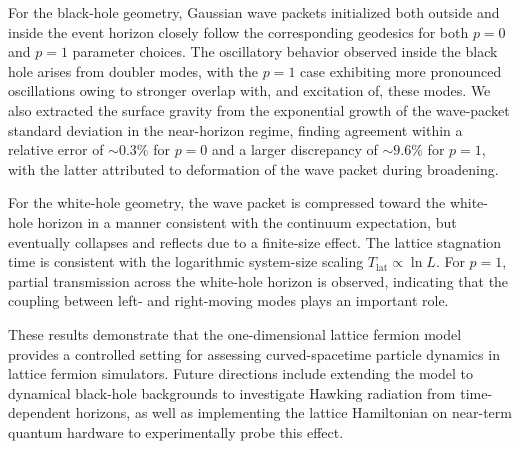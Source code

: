 \documentclass[reprint,amsmath,amssymb,aps,prb,showkeys]{revtex4-2}
\begin{document}
For the black-hole geometry, Gaussian wave packets initialized both outside and inside the event horizon closely follow the corresponding geodesics for both $p=0$ and $p=1$ parameter choices. The oscillatory behavior observed inside the black hole arises from doubler modes, with the $p=1$ case exhibiting more pronounced oscillations owing to stronger overlap with, and excitation of, these modes. We also extracted the surface gravity from the exponential growth of the wave-packet standard deviation in the near-horizon regime, finding agreement within a relative error of $\sim 0.3\%$ for $p=0$ and a larger discrepancy of $\sim 9.6\%$ for $p=1$, with the latter attributed to deformation of the wave packet during broadening.

For the white-hole geometry, the wave packet is compressed toward the white-hole horizon in a manner consistent with the continuum expectation, but eventually collapses and reflects due to a finite-size effect. The lattice stagnation time is consistent with the logarithmic system-size scaling $T_{\mathrm{lat}}\propto\ln L$. For $p=1$, partial transmission across the white-hole horizon is observed, indicating that the coupling between left- and right-moving modes plays an important role.

These results demonstrate that the one-dimensional lattice fermion model provides a controlled setting for assessing curved-spacetime particle dynamics in lattice fermion simulators. Future directions include extending the model to dynamical black-hole backgrounds to investigate Hawking radiation from time-dependent horizons, as well as implementing the lattice Hamiltonian on near-term quantum hardware to experimentally probe this effect.


\end{document}

